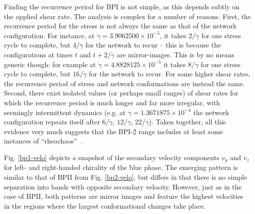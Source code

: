 \documentclass[8.5pt,twoside,twocolumn]{article}
\newcommand{\e}[1]{\times10^{#1}}
\newcommand{\gd}{\dot{\gamma}}
\begin{document}
Finding the recurrence period for BPI is not simple, as
this depends subtly on the applied shear rate. The analysis is complex for
a number of reasons. 
First, the recurrence period for the stress is not always the same as
that of the network configuration. 
For instance, at $\gd=3.9062500\e{-5}$, it takes $2/\gd$ for one
 stress cycle to complete, but $4/\gd$ for the network to recur --
this is because the configurations at times $t$ and $t+2/\gd$ are 
mirror-images. This is by no means generic though: for example
at $\gd=4.8828125\e{-5}$  it takes $8/\gd$ for one
stress cycle to complete, but $16/\gd$ for the network to recur. 
For some higher shear rates, the recurrence period of stress
and network conformations are instead the same.
Second, there exist isolated values (or perhaps small ranges) of shear
rates for which the recurrence period is much longer and far more irregular,
with seemingly intermittent dynamics (e.g. at $\gd=1.3671875\e{-4}$ the
network configuration repeats itself after $6/\gd$, $12/\gd$, $22/\gd$).
Taken together, all this evidence very much suggests that 
the BPI-2 range includes at least some instances of ``rheochaos''~\cite{rheochaos,Cates:2002}.

Fig. \ref{bp1-velo} depicts a snapshot of the secondary velocity 
components $v_y$ and $v_z$ for left- and right-handed chirality of
the blue phase. The emerging pattern is similar to that of BPII from 
Fig. \ref{bp2-velo}, but differs in that there is no simple
separation into bands with opposite secondary velocity. 
However, just as in the case of BPII, both patterns
are mirror images and feature the highest velocities in the regions where 
the largest conformational changes take place. 
\end{document}
